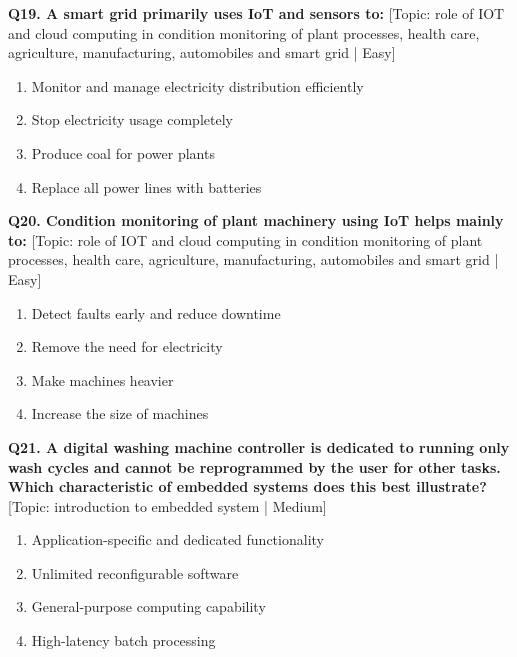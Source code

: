 \noindent\textbf{Q19. A smart grid primarily uses IoT and sensors to:} \hfill [Topic: role of IOT and cloud computing in condition monitoring of plant processes, health care, agriculture, manufacturing, automobiles and smart grid | Easy]
\begin{enumerate}[label=(\alph*),topsep=2pt,itemsep=1pt,partopsep=0pt,parsep=0pt]
    \item {Monitor and manage electricity distribution efficiently}
    \item {Stop electricity usage completely}
    \item {Produce coal for power plants}
    \item {Replace all power lines with batteries}
\end{enumerate}
\vspace{2mm}

\noindent\textbf{Q20. Condition monitoring of plant machinery using IoT helps mainly to:} \hfill [Topic: role of IOT and cloud computing in condition monitoring of plant processes, health care, agriculture, manufacturing, automobiles and smart grid | Easy]
\begin{enumerate}[label=(\alph*),topsep=2pt,itemsep=1pt,partopsep=0pt,parsep=0pt]
    \item {Detect faults early and reduce downtime}
    \item {Remove the need for electricity}
    \item {Make machines heavier}
    \item {Increase the size of machines}
\end{enumerate}
\vspace{2mm}

\noindent\textbf{Q21. A digital washing machine controller is dedicated to running only wash cycles and cannot be reprogrammed by the user for other tasks. Which characteristic of embedded systems does this best illustrate?} \hfill [Topic: introduction to embedded system | Medium]
\begin{enumerate}[label=(\alph*),topsep=2pt,itemsep=1pt,partopsep=0pt,parsep=0pt]
    \item {Application-specific and dedicated functionality}
    \item {Unlimited reconfigurable software}
    \item {General-purpose computing capability}
    \item {High-latency batch processing}
\end{enumerate}
\vspace{2mm}

